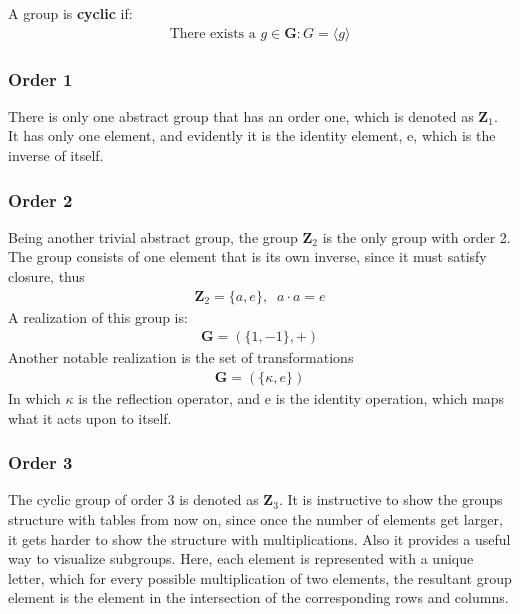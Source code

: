 \begin{definition}
A group is \textbf{cyclic} if:
\begin{align}
\text{There exists a } g \in \mathbf{G} : G = \langle g \rangle
\end{align}
\end{definition}

\subsubsection*{Order 1}
There is only one abstract group that has an order one, which is denoted as $\mathbf{Z}_1$. It has only one element, and evidently it is the identity element, e, which is the inverse of itself. 

\subsubsection*{Order 2}
Being another trivial abstract group, the group $\mathbf{Z}_2$ is the only group with order 2. The group consists of one element that is its own inverse, since it must satisfy closure, thus 
\begin{align}\mathbf{Z}_2 = \{a,e\}, \;\; a \cdot a=e\end{align}
A realization of this group is:
\begin{align}\mathbf{G} = (\{1,-1\},+)\end{align}
Another notable realization is the set of transformations
\begin{align}\mathbf{G} = (\{\kappa,e\})\end{align}
In which $ \kappa $ is the reflection operator, and e is the identity operation, which maps what it acts upon to itself.

\subsubsection*{Order 3}

The cyclic group of order 3 is denoted as $ \mathbf{Z}_3 $. It is instructive to show the groups structure with tables from now on, since once the number of elements get larger, it gets harder to show the structure with multiplications. Also it provides a useful way to visualize subgroups. Here, each element is represented with a unique letter, which for every possible multiplication of two elements, the resultant group element is the element in the intersection of the corresponding rows and columns. 

